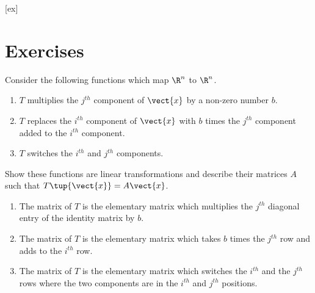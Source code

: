 [ex]
\section*{Exercises}

\begin{enumialphparenastyle}

\begin{ex} \label{exer-linear-transf}
Consider the following functions which map $\R^{n}$ to $\R^{n}$. 

\begin{enumerate}
\item $T$ multiplies the $j^{th}$ component of $\vect{x}$ by a non-zero
number $b.$

\item $T$ replaces the $i^{th}$ component of $\vect{x}$ with $b$ times the
$j^{th}$ component added to the $i^{th}$ component.

\item $T$ switches the $i^{th}$ and $j^{th}$ components.
\end{enumerate}

Show these functions are linear transformations and describe their matrices $A$ such that $T\tup{\vect{x}} = A\vect{x}$.
\begin{sol}
\begin{enumerate}
\item The matrix of $T$ is the elementary matrix which multiplies
the $j^{th}$ diagonal entry of the identity matrix by $b$.
\item The matrix of $T$ is the
elementary matrix which takes $b$ times the $j^{th}$ row and adds to the $%
i^{th}$ row.
\item The matrix of $T$ is the elementary matrix which switches the $%
i^{th}$ and the $j^{th}$ rows where the two components are in the $i^{th}$
and $j^{th}$ positions.
\end{enumerate}
\end{sol}
\end{ex}


\end{enumialphparenastyle}
